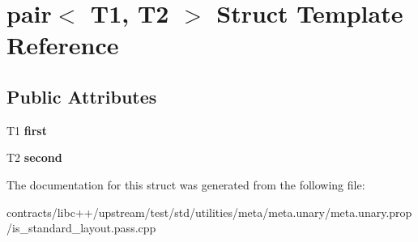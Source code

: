 \hypertarget{structpair}{}\section{pair$<$ T1, T2 $>$ Struct Template Reference}
\label{structpair}
\subsection*{Public Attributes}
\begin{DoxyCompactItemize}
\item 
\mbox{\label{structpair_aed925258783c91efbc5432030709d54e}} 
T1 {\bfseries first}
\item 
\mbox{\label{structpair_a63ae1bbd5a6ce6bd6167b5359fa7a01f}} 
T2 {\bfseries second}
\end{DoxyCompactItemize}


The documentation for this struct was generated from the following file\+:\begin{DoxyCompactItemize}
\item 
contracts/libc++/upstream/test/std/utilities/meta/meta.\+unary/meta.\+unary.\+prop/is\+\_\+standard\+\_\+layout.\+pass.\+cpp\end{DoxyCompactItemize}
